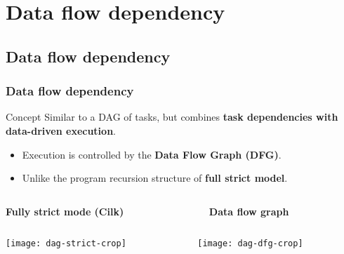 \section{Data flow dependency}
\subsection{Data flow dependency}
\begin{frame}
  \frametitle{Data flow dependency}
  \begin{block}{Concept}
    Similar to a DAG of tasks, but combines {\bf task dependencies with data-driven execution}.
    \begin{itemize}
    \item Execution is controlled by the {\bf Data Flow Graph (DFG)}.
    \item Unlike the program recursion structure of {\bf full strict model}.
    \end{itemize}
  \end{block}
  \vspace{-4mm}
  \begin{columns}
    \begin{column}{0.5\textwidth}
      \begin{center}
	{\bf Fully strict mode (Cilk)}
      \end{center}
    \end{column}
    \begin{column}{0.5\textwidth}
      \begin{center}
	{\bf Data flow graph}
      \end{center}
    \end{column}
  \end{columns}
  \vspace{-2mm}
  \begin{columns}
    \begin{column}{0.5\textwidth}
      \begin{center}
	\texttt{[image: dag-strict-crop]}
      \end{center}
    \end{column}
    \begin{column}{0.5\textwidth}
      \begin{center}
	\texttt{[image: dag-dfg-crop]}
      \end{center}
    \end{column}
  \end{columns}
\end{frame}
